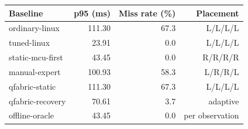 \begin{tabular}{lrrr}
\toprule
Baseline & p95 (ms) & Miss rate (\%) & Placement \\
\midrule
ordinary-linux & 111.30 & 67.3 & L/L/L/L \\
tuned-linux & 23.91 & 0.0 & L/L/L/L \\
static-mcu-first & 43.45 & 0.0 & R/R/R/R \\
manual-expert & 100.93 & 58.3 & L/R/R/L \\
qfabric-static & 111.30 & 67.3 & L/L/L/L \\
qfabric-recovery & 70.61 & 3.7 & adaptive \\
offline-oracle & 43.45 & 0.0 & per observation \\
\bottomrule
\end{tabular}
